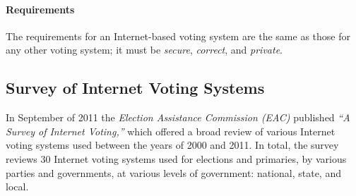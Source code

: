 \paragraph{Requirements}
The requirements for an Internet-based voting system are the same as those for
any other voting system; it must be \emph{secure}, \emph{correct}, and
\emph{private}.

\subsection{Survey of Internet Voting Systems}

In September of 2011 the \emph{Election Assistance Commission (EAC)} published
\emph{``A Survey of Internet Voting,''} which offered a broad review of various
Internet voting systems used between the years of 2000 and
2011.\cite{internet-voting-survey} In total, the survey reviews 30 Internet
voting systems used for elections and primaries, by various parties and
governments, at various levels of government: national, state, and local.

%


%
%
%
%
%

